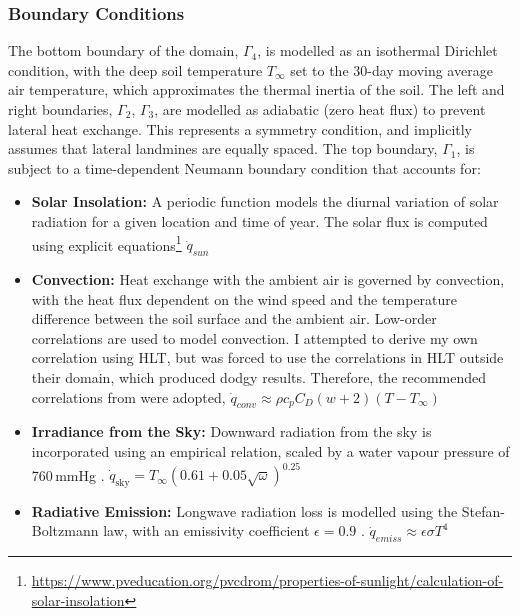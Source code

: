     \subsubsection{Boundary Conditions} The bottom boundary of the domain, $\Gamma_4$, is modelled as an isothermal Dirichlet condition, with the deep soil temperature $T_{\infty}$ set to the 30-day moving average air temperature, which approximates the thermal inertia of the soil. The left and right boundaries, $\Gamma_2$, $\Gamma_3$,  are modelled as adiabatic (zero heat flux) to prevent lateral heat exchange. This represents a symmetry condition, and implicitly assumes that lateral landmines are equally spaced. The top boundary, $\Gamma_1$,  is subject to a time-dependent Neumann boundary condition that accounts for:

    \begin{itemize}
    
        \item \textbf{Solar Insolation:} A periodic function models the diurnal variation of solar radiation for a given location and time of year. The solar flux is computed using explicit equations\footnote{\url{https://www.pveducation.org/pvcdrom/properties-of-sunlight/calculation-of-solar-insolation}} $\dot{q}_{sun}$
        
        \item \textbf{Convection:} Heat exchange with the ambient air is governed by convection, with the heat flux dependent on the wind speed and the temperature difference between the soil surface and the ambient air. Low-order correlations are used to model convection. I attempted to derive my own correlation using HLT, but was forced to use the correlations in HLT outside their domain, which produced dodgy results. Therefore, the recommended correlations from \cite{kahle1997model} were adopted, $\dot{q}_{conv} \approx \rho c_p C_D(w+2)(T - T_{\infty})$
        
        \item \textbf{Irradiance from the Sky:} Downward radiation from the sky is incorporated using an empirical relation, scaled by a water vapour pressure of 760\,mmHg \cite{nguyen2008inverse}. $\dot{q}_{\text{sky}} = T_{\infty} \left( 0.61 + 0.05 \sqrt{\omega} \right)^{0.25}$
        
        \item \textbf{Radiative Emission:} Longwave radiation loss is modelled using the Stefan-Boltzmann law, with an emissivity coefficient \(\epsilon = 0.9\) \cite{nguyen2008inverse}. $\dot{q}_{emiss} \approx \epsilon \sigma T^4$
        
    \end{itemize}


